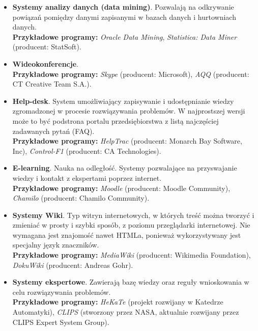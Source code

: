 \begin{itemize}
\item \textbf{Systemy analizy danych (data mining)}. Pozwalają na odkrywanie powiązań pomiędzy danymi zapisanymi w bazach danych i hurtowniach danych.\\
\textbf{Przykładowe programy:} \textit{Oracle Data Mining}, \textit{Statistica: Data Miner} (producent: StatSoft).

\item \textbf{Wideokonferencje}.\\
\textbf{Przykładowe programy:} \textit{Skype} (producent: Microsoft), \textit{AQQ} (producent: CT Creative Team S.A.).

\item \textbf{Help-desk}. System umożliwiający zapisywanie i udostępnianie wiedzy zgromadzonej w procesie rozwiązywania problemów. W najprostszej wersji może to być podstrona portalu przedsiębiorstwa z listą najczęściej zadawanych pytań (FAQ).\\
\textbf{Przykładowe programy:} \textit{HelpTrac} (producent: Monarch Bay Software, Inc), \textit{Control-F1} (producent: CA Technologies).

\item \textbf{E-learning}. Nauka na odległość. Systemy pozwalające na przyswajanie wiedzy i kontakt z ekspertami poprzez internet.\\
\textbf{Przykładowe programy:} \textit{Moodle} (producent: Moodle Community), \textit{Chamilo} (producent: Chamilo Community).

\item \textbf{Systemy Wiki}. Typ witryn internetowych, w których treść można tworzyć i zmieniać w prosty i szybki sposób, z poziomu przeglądarki internetowej. Nie wymagana jest znajomość nawet HTMLa, ponieważ wykorzystywany jest specjalny język znaczników.\\
\textbf{Przykładowe programy:} \textit{MediaWiki} (producent: Wikimedia Foundation), \textit{DokuWiki} (producent: Andreas Gohr).

\item \textbf{Systemy ekspertowe}. Zawierają bazę wiedzy oraz reguły wnioskowania w celu rozwiązywania problemów.\\
\textbf{Przykładowe programy:} \textit{HeKaTe} (projekt rozwijany w Katedrze Automatyki), \textit{CLIPS} (stworzony przez NASA, aktualnie rozwijany przez CLIPS Expert System Group).

\end{itemize}

\clearpage

